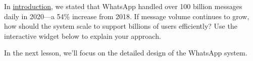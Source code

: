 In \href{https://www.educative.io/courses/grokking-the-system-design-interview/system-design-whatsapp}{introduction}, we stated that WhatsApp handled over 100 billion messages daily in 2020---a 54\% increase from 2018. If message volume continues to grow, how should the system scale to support billions of users efficiently? Use the interactive widget below to explain your approach.

In the next lesson, we'll focus on the detailed design of the WhatsApp system.

